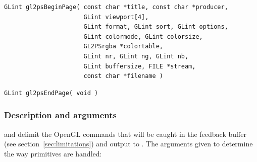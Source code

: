 \begin{verbatim}
GLint gl2psBeginPage( const char *title, const char *producer,
                      GLint viewport[4],
                      GLint format, GLint sort, GLint options,
                      GLint colormode, GLint colorsize,
                      GL2PSrgba *colortable,
                      GLint nr, GLint ng, GLint nb,
                      GLint buffersize, FILE *stream,
                      const char *filename )
\end{verbatim}

\begin{verbatim}
GLint gl2psEndPage( void )
\end{verbatim}

\subsubsection{Description and arguments}

 and  delimit the OpenGL commands that
will be caught in the feedback buffer (see section~\ref{sec:limitations})
and output to . The arguments given to 
determine the way primitives are handled:

